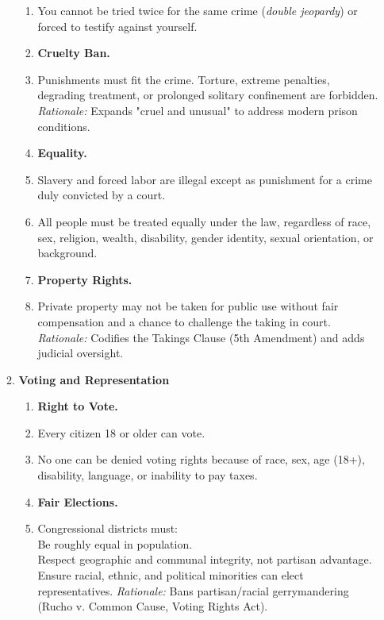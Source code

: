 \documentclass{article}
\begin{document}
\begin{multicols}{2}
\begin{enumerate}[label=\Alph*)]
\begin{enumerate}[label=\Alph*), start=4]
\begin{enumerate}[label=2.2.\arabic*]
        \item You cannot be tried twice for the same crime (\textit{double jeopardy}) or forced to testify against yourself.
        
        \item[] \textbf{Cruelty Ban.}
        \item Punishments must fit the crime. Torture, extreme penalties, degrading treatment, or prolonged solitary confinement are forbidden.  
        \textit{Rationale:} Expands "cruel and unusual" to address modern prison conditions.
        
        \item[] \textbf{Equality.}
        \item Slavery and forced labor are illegal except as punishment for a crime duly convicted by a court.
        
        \item All people must be treated equally under the law, regardless of race, sex, religion, wealth, disability, gender identity, sexual orientation, or background.
        
        \item[] \textbf{Property Rights.}
        \item Private property may not be taken for public use without fair compensation and a chance to challenge the taking in court.  
        \textit{Rationale:} Codifies the Takings Clause (5th Amendment) and adds judicial oversight.
    \end{enumerate}
    
    \item \textbf{Voting and Representation}
    
    \begin{enumerate}[label=2.3.\arabic*]
        \item[] \textbf{Right to Vote.}
        \item Every citizen 18 or older can vote.
        
        \item No one can be denied voting rights because of race, sex, age (18+), disability, language, or inability to pay taxes.
        
        \item[] \textbf{Fair Elections.}
        \item Congressional districts must: \\
        Be roughly equal in population. \\
        Respect geographic and communal integrity, not partisan advantage. \\
        Ensure racial, ethnic, and political minorities can elect representatives.  
        \textit{Rationale:} Bans partisan/racial gerrymandering (Rucho v. Common Cause, Voting Rights Act).
    \end{enumerate}
    

\end{enumerate}
\end{enumerate}
\end{multicols}
\end{document}
